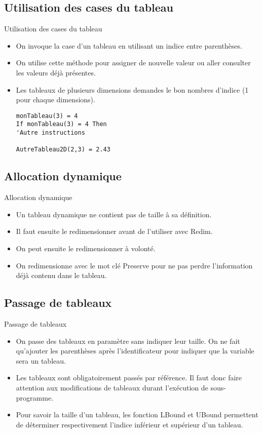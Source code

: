 \documentclass[aspectratio=169,usenames,dvipsnames]{beamer}
\begin{document}
    \subsection{Utilisation des cases du tableau}
    \begin{frame}[fragile]{Utilisation des cases du tableau}
        \begin{itemize}
            \item On invoque la case d’un tableau en utilisant un indice entre parenthèses.
            \item On utilise cette méthode pour assigner de nouvelle valeur ou aller consulter les valeurs déjà présentes.
            \item Les tableaux de plusieurs dimensions demandes le bon nombres d’indice (1 pour chaque dimensions).
\begin{lstlisting}
monTableau(3) = 4
If monTableau(3) = 4 Then
'Autre instructions

AutreTableau2D(2,3) = 2.43
\end{lstlisting}  
        \end{itemize}
    \end{frame}
    \subsection{Allocation dynamique}
    \begin{frame}{Allocation dynamique}
        \begin{itemize}
            \item Un tableau dynamique ne contient pas de taille à sa définition.
            \item Il faut ensuite le redimensionner avant de l’utiliser avec Redim.
            \item On peut ensuite le redimensionner à volonté.
            \item On redimensionne avec le mot clé Preserve pour ne pas perdre l’information déjà contenu dans le tableau.
        \end{itemize}
    \end{frame}
    \subsection{Passage de tableaux}
    \begin{frame}{Passage de tableaux}
        \begin{itemize}
            \item On passe des tableaux en paramètre sans indiquer leur taille. On ne fait qu’ajouter les parenthèses après l’identificateur pour indiquer que la variable sera un tableau.
            \item Les tableaux sont obligatoirement passés par référence. Il faut donc faire attention aux modifications de tableaux durant l’exécution de sous-programme.
            \item Pour savoir la taille d’un tableau, les fonction LBound et UBound permettent de déterminer respectivement l’indice inférieur et supérieur d’un tableau.
        \end{itemize}
    \end{frame}
\end{document}
